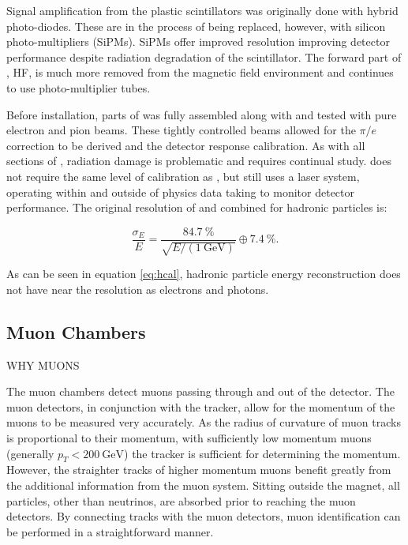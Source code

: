Signal amplification from the plastic scintillators was originally done with hybrid photo-diodes.  These are in the process of being replaced, however, with silicon photo-multipliers (SiPMs).  SiPMs offer improved resolution improving detector performance despite radiation degradation of the scintillator.  The forward part of \HCAL, HF, is much more removed from the magnetic field environment and continues to use photo-multiplier tubes.

Before installation, parts of \HCAL was fully assembled along with \ECAL and tested with pure electron and pion beams.  These tightly controlled beams allowed for the \ensuremath{\pi / e} correction to be derived and the detector response calibration.  As with all sections of \CMS, radiation damage is problematic and requires continual study.  \HCAL does not require the same level of calibration as \ECAL, but still uses a laser system, operating within and outside of physics data taking to monitor detector performance.  The original resolution of \CMS \ECAL and \HCAL combined for hadronic particles is:

\begin{equation}\label{eq:hcal}
    \frac{\sigma_{E}}{E}
    =   
    \frac{\SI{84.7}{\%}}{\sqrt{E/\left(\SI{1}{\GeV}\right)}}
    \oplus
    \SI{7.4}{\%}.
\end{equation}

As can be seen in equation \ref{eq:hcal}, hadronic particle energy reconstruction does not have near the resolution as electrons and photons. 

\subsection{Muon Chambers}
WHY MUONS

The muon chambers detect muons passing through and out of the detector. The muon detectors, in conjunction with the tracker, allow for the momentum of the muons to be measured very accurately. As the radius of curvature of muon tracks is proportional to their momentum, with sufficiently low momentum muons (generally \ensuremath{p_T < \SI{200}{\GeV}}) the tracker is sufficient for determining the momentum.  However, the straighter tracks of higher momentum muons benefit greatly from the additional information from the muon system. Sitting outside the \CMS magnet, all particles, other than neutrinos, are absorbed prior to reaching the muon detectors.  By connecting tracks with the muon detectors, muon identification can be performed in a straightforward manner.

